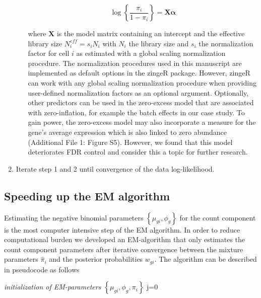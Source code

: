 \documentclass{bmcart}
\newcommand{\mb}[1]{\boldsymbol{\mathbf{#1}}}
\begin{document}
\begin{backmatter}
\begin{enumerate}
\begin{enumerate}
		\[ \log\left\{\frac{\pi_{i}}{1-\pi_{i}}\right\} = \mb{X}\mb{\alpha} \]

		where $\mb{X}$ is the model matrix containing an intercept and the effective library size $N_i^{eff} = s_i N_i$ with $N_i$ the library size and $s_i$ the normalization factor for cell $i$ as estimated with a global scaling normalization procedure. The normalization procedures used in this manuscript are implemented as default options in the zingeR package. However, zingeR can work with any global scaling normalization procedure when providing user-defined normalization factors as an optional argument. Optionally, other predictors can be used in the zero-excess model that are associated with zero-inflation, for example the batch effects in our case study. To gain power, the zero-excess model may also incorporate a measure for the gene's average expression which is also linked to zero abundance (Additional File 1: Figure S5). However, we found that this model deteriorates FDR control and consider this a topic for further research.
	\end{enumerate}

	\item Iterate step 1 and 2 until convergence of the data log-likelihood.
\end{enumerate}


\subsection*{Speeding up the EM algorithm}
Estimating the negative binomial parameters $\left\{\mu_{gi},\phi_g\right\}$ for the count component is the most computer intensive step of the EM algorithm.
In order to reduce computational burden we developed an EM-algorithm that only estimates the count component parameters after iterative convergence between the mixture parameters $\hat{\pi}_{i}$ and the posterior probabilities $w_{gi}$. The algorithm can be described in pseudocode as follows

\IncMargin{1em}
\begin{algorithm}[H]
 \emph{initialization of EM-parameters $\left\{\mu_{gi}, \phi_g, \pi_i\right\}$}\;
 j=0\;
\end{algorithm}


\end{backmatter}
\end{document}
